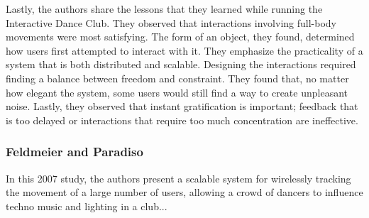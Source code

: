 Lastly, the authors share the lessons that they learned while running the Interactive Dance Club. They observed that interactions involving full-body movements were most satisfying. The form of an object, they found, determined how users first attempted to interact with it. They emphasize the practicality of a system that is both distributed and scalable. Designing the interactions required finding a balance between freedom and constraint. They found that, no matter how elegant the system, some users would still find a way to create unpleasant noise. Lastly, they observed that instant gratification is important; feedback that is too delayed or interactions that require too much concentration are ineffective.

\subsubsection{Feldmeier and Paradiso}

In this 2007 study, the authors present a scalable system for wirelessly tracking the movement of a large number of users, allowing a crowd of dancers to influence techno music and lighting in a club...

